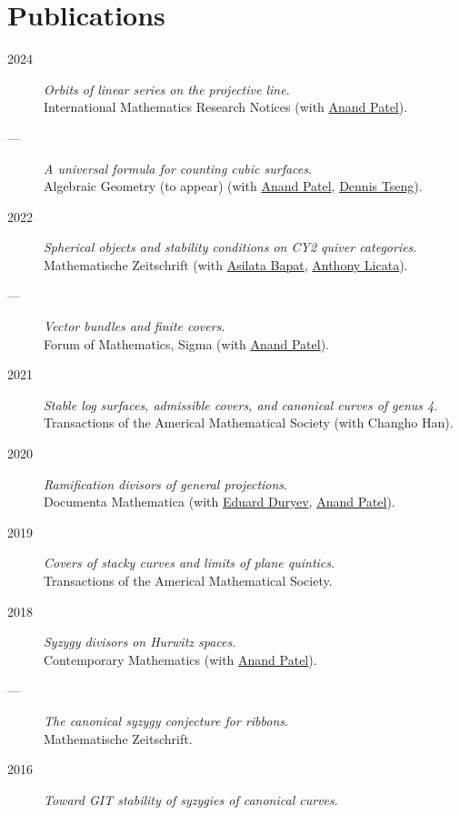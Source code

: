 \documentclass[11pt]{article}
\begin{document}
\section*{Publications}
\label{sec:org162c1fd}
\label{orgacd079d}
\begin{description}
\item[{2024}] \emph{Orbits of linear series on the projective line}.\\
International Mathematics Research Notices (with \href{https://sites.google.com/view/anand-patel}{Anand Patel}).
\item[{---}] \emph{A universal formula for counting cubic surfaces}.\\
Algebraic Geometry (to appear) (with \href{https://sites.google.com/view/anand-patel}{Anand Patel}, \href{https://sites.google.com/view/dennis-tseng}{Dennis Tseng}).
\item[{2022}] \emph{Spherical objects and stability conditions on CY2 quiver categories}.\\
Mathematische Zeitschrift (with \href{https://asilata.org/}{Asilata Bapat}, \href{https://maths-people.anu.edu.au/\~licatat/}{Anthony Licata}).
\item[{---}] \emph{Vector bundles and finite covers}.\\
Forum of Mathematics, Sigma (with \href{https://sites.google.com/view/anand-patel}{Anand Patel}).
\item[{2021}] \emph{Stable log surfaces, admissible covers, and canonical curves of genus 4}.\\
Transactions of the Americal Mathematical Society (with Changho Han).
\item[{2020}] \emph{Ramification divisors of general projections}.\\
Documenta Mathematica (with \href{https://eduryev.weebly.com/}{Eduard Duryev}, \href{https://sites.google.com/view/anand-patel}{Anand Patel}).
\item[{2019}] \emph{Covers of stacky curves and limits of plane quintics}.\\
Transactions of the Americal Mathematical Society.
\item[{2018}] \emph{Syzygy divisors on Hurwitz spaces}.\\
Contemporary Mathematics (with \href{https://sites.google.com/view/anand-patel}{Anand Patel}).
\item[{---}] \emph{The canonical syzygy conjecture for ribbons}.\\
Mathematische Zeitschrift.
\item[{2016}] \emph{Toward GIT stability of syzygies of canonical curves}.\\

\end{description}
\end{document}
